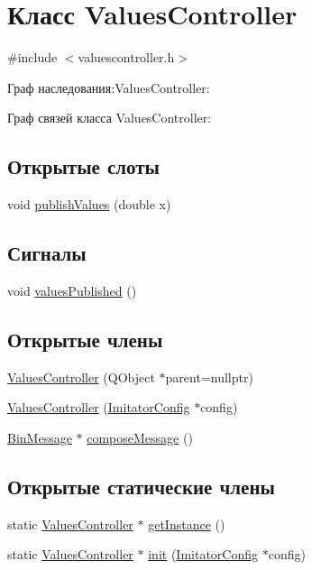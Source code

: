 \hypertarget{class_values_controller}{}\section{Класс Values\+Controller}
\label{class_values_controller}


{\ttfamily \#include $<$valuescontroller.\+h$>$}



Граф наследования\+:Values\+Controller\+:


Граф связей класса Values\+Controller\+:
\subsection*{Открытые слоты}
\begin{DoxyCompactItemize}
\item 
void \hyperlink{class_values_controller_ad492dddd3ed3d3aea671ed2115ba4231}{publish\+Values} (double x)
\end{DoxyCompactItemize}
\subsection*{Сигналы}
\begin{DoxyCompactItemize}
\item 
void \hyperlink{class_values_controller_ab8b868daf6749f35165d7f0ebf4ae35e}{values\+Published} ()
\end{DoxyCompactItemize}
\subsection*{Открытые члены}
\begin{DoxyCompactItemize}
\item 
\hyperlink{class_values_controller_a79c5f5459d0fa9c0ae201f7af9a21f89}{Values\+Controller} (Q\+Object $\ast$parent=nullptr)
\item 
\hyperlink{class_values_controller_a9d8f277bbf71b14581286225e81d4c93}{Values\+Controller} (\hyperlink{class_imitator_config}{Imitator\+Config} $\ast$config)
\item 
\hyperlink{class_bin_message}{Bin\+Message} $\ast$ \hyperlink{class_values_controller_a3ff8d09321924df6d04310463d0660c6}{compose\+Message} ()
\end{DoxyCompactItemize}
\subsection*{Открытые статические члены}
\begin{DoxyCompactItemize}
\item 
static \hyperlink{class_values_controller}{Values\+Controller} $\ast$ \hyperlink{class_values_controller_a2b7b09d37db8c1cf82d35024254b5628}{get\+Instance} ()
\item 
static \hyperlink{class_values_controller}{Values\+Controller} $\ast$ \hyperlink{class_values_controller_ae0d02102d635c83549ada9d9ed21d728}{init} (\hyperlink{class_imitator_config}{Imitator\+Config} $\ast$config)
\end{DoxyCompactItemize}
